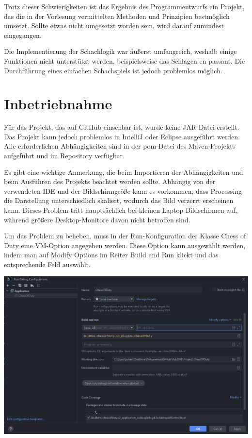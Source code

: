 Trotz dieser Schwierigkeiten ist das Ergebnis des Programmentwurfs ein Projekt, das die in der Vorlesung vermittelten Methoden und Prinzipien bestmöglich umsetzt. 
Sollte etwas nicht umgesetzt worden sein, wird darauf zumindest eingegangen. 

Die Implementierung der Schachlogik war äußerst umfangreich, weshalb einige Funktionen nicht unterstützt werden, beispielsweise das Schlagen en passant.
Die Durchführung eines einfachen Schachspiels ist jedoch problemlos möglich.

\section{Inbetriebnahme}

Für das Projekt, das auf GitHub einsehbar ist, wurde keine JAR-Datei erstellt. 
Das Projekt kann jedoch problemlos in IntelliJ oder Eclipse ausgeführt werden. 
Alle erforderlichen Abhängigkeiten sind in der pom-Datei des Maven-Projekts aufgeführt und im Repository verfügbar.

Es gibt eine wichtige Anmerkung, die beim Importieren der Abhängigkeiten und beim Ausführen des Projekts beachtet werden sollte. 
Abhängig von der verwendeten IDE und der Bildschirmgröße kann es vorkommen, dass Processing die Darstellung unterschiedlich skaliert, wodurch das Bild verzerrt erscheinen kann.
Dieses Problem tritt hauptsächlich bei kleinen Laptop-Bildschirmen auf, während größere Desktop-Monitore davon nicht betroffen sind.

Um das Problem zu beheben, muss in der Run-Konfiguration der Klasse \glqq Chess of Duty\grqq{} eine VM-Option angegeben werden. 
Diese Option kann ausgewählt werden, indem man auf \glqq Modify Options\grqq{} im Reiter \glqq Build and Run\grqq{} klickt und das entsprechende Feld auswählt.

\begin{minipage}{\linewidth}
    \centering
    \includegraphics[scale=0.45]{Bilder/erklaerung_01.PNG}
\end{minipage}

